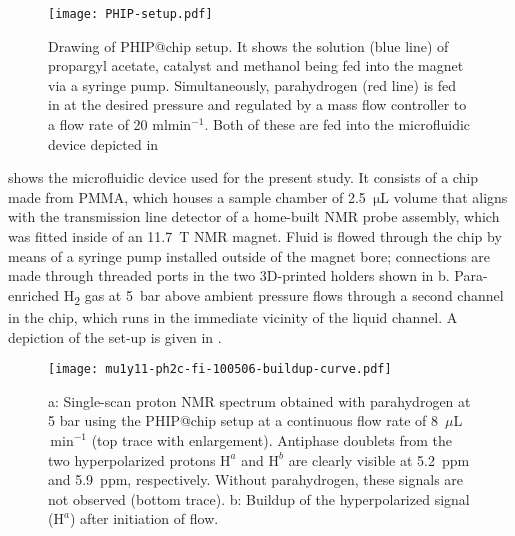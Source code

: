 \begin{figure}
  \begin{center}
  \texttt{[image: PHIP-setup.pdf]}
  \end{center}
  \caption{Drawing of PHIP@chip setup. It shows the solution (blue line)
  of propargyl acetate, catalyst and methanol being fed into the magnet
  via a syringe pump. Simultaneously, parahydrogen (red line) is fed in
  at the desired pressure and regulated by a mass flow controller to a
  flow rate of 20 ml$\text{min}^{-1}$. Both of these are fed into the
  microfluidic device depicted in }
  \label{fig:SetUp}
\end{figure}

 shows the microfluidic device used for the
present study. It consists of a chip made from PMMA, which houses a sample
chamber of 2.5~$\mathrm{\mu L}$ volume that aligns with the transmission line
detector of a home-built NMR probe assembly, which was fitted inside of an
11.7~T NMR magnet.
Fluid is flowed through the chip by means of a syringe pump
installed outside of the magnet bore; connections are made through threaded
ports in the two 3D-printed holders shown in b.
Para-enriched H\textsubscript{2} gas at 5~bar above ambient pressure flows
through a second
channel in the chip, which runs in
the immediate vicinity of the liquid channel. A depiction of the set-up is given in .


\begin{figure}
	\centering
	\texttt{[image: mu1y11-ph2c-fi-100506-buildup-curve.pdf]}
	\caption{a: Single-scan proton NMR spectrum obtained with
  parahydrogen at 5 bar using the PHIP@chip setup at a continuous
  flow rate of 8~$\mu$L$\,\text{min}^{-1}$ (top trace with enlargement).
  Antiphase doublets from the two
	hyperpolarized protons $\mathrm{H}^a$  and $\mathrm{H}^{b}$ are
  clearly visible at 5.2~ppm and 5.9~ppm, respectively. Without
  parahydrogen, these signals are not observed (bottom trace).
	b: Buildup of the hyperpolarized signal ($\mathrm{H}^{a}$)
  after initiation of flow.
	}
	\label{fig:phip@chip2}
\end{figure}


